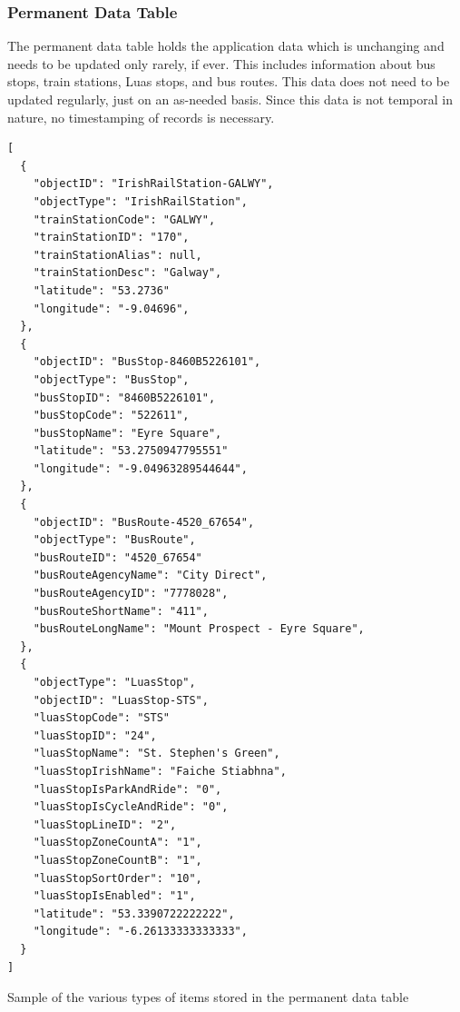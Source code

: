 \documentclass[a4paper,11pt]{report}
\newenvironment{code}{\captionsetup{type=listing}}{}
\begin{document}
\subsubsection{Permanent Data Table}
The permanent data table holds the application data which is unchanging and needs to be updated only rarely, if ever.
This includes information about bus stops, train stations, Luas stops, and bus routes.
This data does not need to be updated regularly, just on an as-needed basis.
Since this data is not temporal in nature, no timestamping of records is necessary.

\begin{code}
\begin{verbatim}
[
  {
    "objectID": "IrishRailStation-GALWY",
    "objectType": "IrishRailStation",
    "trainStationCode": "GALWY",
    "trainStationID": "170",
    "trainStationAlias": null,
    "trainStationDesc": "Galway",
    "latitude": "53.2736"
    "longitude": "-9.04696",
  },
  {
    "objectID": "BusStop-8460B5226101",
    "objectType": "BusStop",
    "busStopID": "8460B5226101",
    "busStopCode": "522611",
    "busStopName": "Eyre Square",
    "latitude": "53.2750947795551"
    "longitude": "-9.04963289544644",
  },
  {
    "objectID": "BusRoute-4520_67654",
    "objectType": "BusRoute",
    "busRouteID": "4520_67654"
    "busRouteAgencyName": "City Direct",
    "busRouteAgencyID": "7778028",
    "busRouteShortName": "411",
    "busRouteLongName": "Mount Prospect - Eyre Square",
  },
  {
    "objectType": "LuasStop",
    "objectID": "LuasStop-STS",
    "luasStopCode": "STS"
    "luasStopID": "24",
    "luasStopName": "St. Stephen's Green",
    "luasStopIrishName": "Faiche Stiabhna",
    "luasStopIsParkAndRide": "0",
    "luasStopIsCycleAndRide": "0",
    "luasStopLineID": "2",
    "luasStopZoneCountA": "1",
    "luasStopZoneCountB": "1",
    "luasStopSortOrder": "10",
    "luasStopIsEnabled": "1",
    "latitude": "53.3390722222222",
    "longitude": "-6.26133333333333",
  }
]
\end{verbatim}
\caption{Sample of the various types of items stored in the permanent data table}
\end{code}
\end{document}
